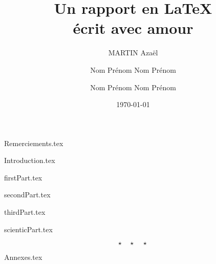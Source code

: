 \documentclass{rUTT}
\title{Un rapport en \LaTeX \\ écrit avec amour}
\date{\today}
\author{
    {\sc MARTIN} Azaël
    \and
    {\sc Nom} Prénom
    \break
    {\sc Nom} Prénom
    \and
    {\sc Nom} Prénom
    \break
    {\sc Nom} Prénom
    }
\begin{document}

    \frontpagereports %



    \clearpage

    \justifying

    {Remerciements.tex}

    \clearpage

    {Introduction.tex}

    \clearpage

    {firstPart.tex}

    \clearpage

    {secondPart.tex}

    \clearpage

    {thirdPart.tex}

    \clearpage

    {scienticPart.tex}

    \clearpage

    \[ \star \quad \star \quad \star \]

    {Annexes.tex}

    \clearpage


    {
    \raggedright %
    \sloppy
    \nocite{*} %
    \printbibliography[title={Bibliographie},heading=bibintoc]

    \clearpage

    \listoffigures
    \listoftables
    }

    \clearpage
    \setcounter{tocdepth}{10} %
    \tableofcontents
\end{document}
